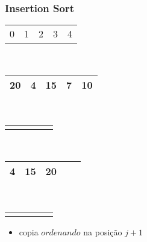 \documentclass{beamer}
\begin{document}
\begin{frame}
    \frametitle{Insertion Sort}
    \begin{center}
        \begin{table}
            \begin{tabular}{p{0.25cm} p{0.25cm} p{0.25cm} p{0.25cm} p{0.25cm}}
                0 & 1 & 2 & 3 & 4
            \end{tabular} \\
            \begin{tabular}{| p{0.25cm} | p{0.25cm} | p{0.25cm} | p{0.25cm} | p{0.25cm} |}
                \hline
                20 & 4 & 15 & 7 & 10 \\ \hline
            \end{tabular} \\
            \begin{tabular}{p{0.25cm} p{0.25cm} p{0.25cm} p{0.25cm} p{0.25cm}}
                & & \color{green}{$\uparrow$} & &
            \end{tabular} \\
            \begin{tabular}{| p{0.25cm} | p{0.25cm} | p{0.25cm} | p{0.25cm} | p{0.25cm} |}
                \hline
                4 & 15 & 20 & & \\ \hline
            \end{tabular} \\
            \begin{tabular}{p{0.25cm} p{0.25cm} p{0.25cm} p{0.25cm} p{0.25cm}}
                 & \color{blue}{$\uparrow$} & & &
            \end{tabular}
        \end{table}
	\end{center}
    \color{green}{$ordenando = 15$}
    \begin{itemize}[<+->]
        \item copia $ordenando$ na posição $j + 1$
    \end{itemize}
\end{frame}
\end{document}
